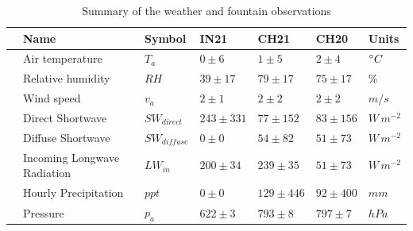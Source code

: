 \documentclass[utf8]{frontiersSCNS} %
\begin{document}
\begin{table}
	\centering
	\caption{ Summary of the weather and fountain observations}
	\label{tab:Observations}
	\begin{tabular}{@{}|lllllll|@{}}
		\toprule
		\textbf{}              & \textbf{Name}               & \textbf{Symbol}     & \textbf{IN21} &
		\textbf{CH21}          & \textbf{CH20}               & \textbf{Units}                                                                 \\ \midrule
		\multicolumn{1}{|l|}{\multirow{9}{*}{\rotatebox[origin=c]{90}{Weather}}}
		                       & Air temperature             & $T_a    $           & $0 \pm 6$     & $1 \pm 5$    & $2
		\pm 4$                 & $\degree C$                                                                                                  \\
		\multicolumn{1}{|l|}{} & Relative humidity           & $RH     $           & $39 \pm 17$   & $79 \pm 17$  & $75
		\pm 17$                & \%                                                                                                           \\
		\multicolumn{1}{|l|}{} & Wind speed                  & $v_a        $       & $2 \pm 1$     & $2 \pm 2$    &
		$2 \pm 2$              & $m/s$                                                                                                        \\
		\multicolumn{1}{|l|}{} & Direct Shortwave            & $SW_{direct} $      & $243 \pm 331$ & $77 \pm 152$
		                       & $83 \pm 156$                & $W\,m^{-2}$                                                                    \\
		\multicolumn{1}{|l|}{} & Diffuse Shortwave           & $SW_{diffuse}$      & $0 \pm 0$     & $54 \pm 82$  & $51 \pm 73$ & $W\,m^{-2}$ \\
		\multicolumn{1}{|l|}{} & Incoming Longwave Radiation & $LW_{in}$           & $200 \pm 34$  & $239 \pm 35$ & $51 \pm 73$ & $W\,m^{-2}$ \\
		\multicolumn{1}{|l|}{} & Hourly Precipitation        & $ppt        $       & $0 \pm 0$     & $129 \pm
		446$                   & $92 \pm 400$                & $mm$                                                                           \\
		\multicolumn{1}{|l|}{} & Pressure                    & $p_a         $      & $622 \pm 3$   & $793 \pm 8$  &
		$797 \pm7$             & $hPa$                                                                                                        \\

\end{tabular}
\end{table}
\end{document}
